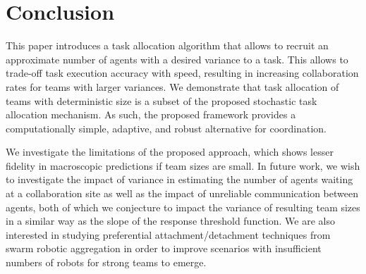 \documentclass{TeXstyles/DARS/svmult}  %
\begin{document}
%




\section{Conclusion}\label{sec:conclusion}
This paper introduces a task allocation algorithm that allows to recruit an approximate number of agents with a desired variance to a task. This allows to trade-off task execution accuracy with speed, resulting in increasing collaboration rates for teams with larger variances. 
We demonstrate that task allocation of teams with deterministic size is a subset of the proposed stochastic task allocation mechanism. As such, the proposed framework provides a computationally simple, adaptive, and robust alternative for coordination.

We investigate the limitations of the proposed approach, which shows lesser fidelity in macroscopic predictions if team sizes are small. In future work, we wish to investigate the impact of variance in estimating the number of agents waiting at a collaboration site as well as the impact of unreliable communication between agents, both of which we conjecture to impact the variance of resulting team sizes in a similar way as the slope of the response threshold function. We are also interested in studying preferential attachment/detachment techniques from swarm robotic aggregation in order to improve scenarios with insufficient numbers of robots for strong teams to emerge. 
\end{document}
